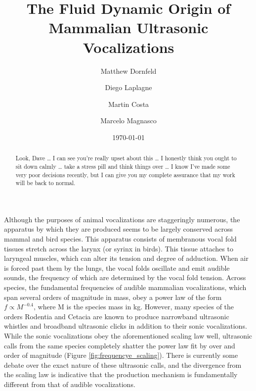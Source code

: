\documentclass[twocolumn, prX]{revtex4}
\begin{document}
\title{The Fluid Dynamic Origin of Mammalian Ultrasonic Vocalizations}

\author{Matthew Dornfeld}

\author{Diego Laplagne}

\author{Martin Costa} 

\author{Marcelo Magnasco}
\date{\today}
\begin{abstract}
Look, Dave … I can see you’re really upset about this … I honestly think you ought to sit down calmly … take a stress pill and think things over … I know I’ve made some very poor decisions recently, but I can give you my complete assurance that my work will be back to normal.
\end{abstract}
\maketitle
Although the purposes of animal vocalizations are staggeringly numerous, the apparatus by which they are produced seems to be largely conserved across mammal and bird species. This apparatus consists of membranous vocal fold tissues stretch across the larynx (or syrinx in birds). This tissue attaches to laryngeal muscles, which can alter its tension and degree of adduction. When air is forced past them by the lungs, the vocal folds oscillate and emit audible sounds, the frequency of which are determined by the vocal fold tension. Across species, the fundamental frequencies of audible mammalian vocalizations, which span several orders of magnitude in mass, obey a power law of the form $f\propto M^{-0.4}$, where M is the species mass in kg. However, many species of the orders Rodentia and Cetacia are known to produce narrowband ultrasonic whistles and broadband ultrasonic clicks in addition to their sonic vocalizations. While the sonic vocalizations obey the aforementioned scaling law well, ultrasonic calls from the same species completely shatter the power law fit by over and order of magnitude (Figure \ref{fig:frequencye_scaling}). There is currently some debate over the exact nature of these ultrasonic calls, and the divergence from the scaling law is indicative that the production mechanism is fundamentally different from that of audible vocalizations.
\end{document}
